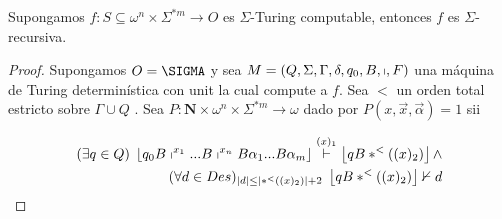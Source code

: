 	\begin{theorem}
		\PN Supongamos $f: S \subseteq \omega^{n} \times \Sigma^{\ast m} \rightarrow O$ es $\Sigma$-Turing computable,
    entonces $f$ es $\Sigma$-recursiva.
  \end{theorem}
	\begin{proof}
    Supongamos $O=\SIGMA$ y sea $M=\left( Q,\Sigma ,\Gamma ,\delta ,q_{0},B,\shortmid ,F\right) $
    una máquina de Turing determinística con unit la cual compute a $f$. Sea $< $ un orden total estricto sobre
    $\Gamma \cup Q$ . Sea $P:\mathbf{N}\times \omega ^{n}\times \Sigma ^{\ast m}\rightarrow \omega $ dado por
    $P(x,\vec{x},\vec{\alpha})=1$ sii

    \begin{eqnarray*}
      (\exists q\in Q)\;
        \left\lfloor q_{0}B\shortmid ^{x_{1}}...B\shortmid ^{x_{n}}B\alpha _{1}...B\alpha _{m}\right\rfloor
        \overset{(x)_{1}}{\vdash }
        \left\lfloor qB\ast ^{< }((x)_{2})\right\rfloor \wedge \\
       (\forall d\in Des)
         _{\left\vert d\right\vert \leq \left\vert \ast ^{< }((x)_{2})\right\vert +2}\;
         \left\lfloor qB\ast ^{< }((x)_{2})\right\rfloor \nvdash d
    \end{eqnarray*}


\end{proof}
